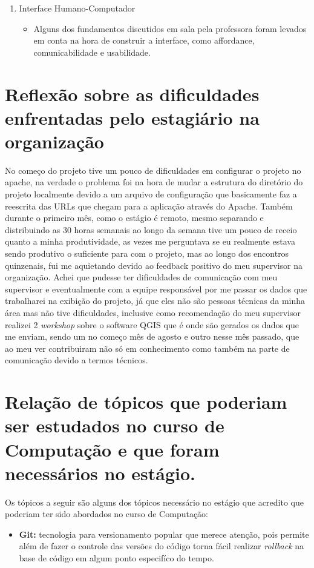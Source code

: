 \documentclass{ufscar}
\begin{document}
\begin{enumerate}
  \item Interface Humano-Computador
  \begin{itemize}
    \item Alguns dos fundamentos discutidos em sala pela professora foram levados em conta na hora de construir a interface, como affordance, comunicabilidade e usabilidade.
  \end{itemize}

\end{enumerate}

\section{Reflexão sobre as dificuldades enfrentadas pelo estagiário na organização}
No começo do projeto tive um pouco de dificuldades em configurar o projeto no apache, na verdade o problema foi na hora de mudar a estrutura do diretório do projeto localmente devido a um arquivo de configuração que basicamente faz a reescrita das URLs que chegam para a aplicação através do Apache. Também durante o primeiro mês, como o estágio é remoto, mesmo separando e distribuindo as 30 horas semanais ao longo da semana tive um pouco de receio quanto a minha produtividade, as vezes me perguntava se eu realmente estava sendo produtivo o suficiente para com o projeto, mas ao longo dos encontros quinzenais, fui me aquietando devido ao feedback positivo do meu supervisor na organização.
Achei que pudesse ter dificuldades de comunicação com meu supervisor e eventualmente com a equipe responsável por me passar os dados que trabalharei na exibição do projeto, já que eles não são pessoas técnicas da minha área mas não tive dificuldades, inclusive como recomendação do meu supervisor realizei 2 \textit{workshop} sobre o software QGIS que é onde são gerados os dados que me enviam, sendo um no começo mês de agosto e outro nesse mês passado, que ao meu ver contribuiram não só em conhecimento como também na parte de comunicação devido a termos técnicos.

\section{Relação de tópicos que poderiam ser estudados no curso de Computação e que foram necessários no estágio.}
Os tópicos a seguir são alguns dos tópicos necessário no estágio que acredito que poderiam ter sido abordados no curso de Computação:
\begin{itemize}
  \item \textbf{Git:} tecnologia para versionamento popular que merece atenção, pois permite além de fazer o controle das versões do código torna fácil realizar \textit{rollback} na base de código em algum ponto especifíco do tempo.
\end{itemize}
\end{document}
